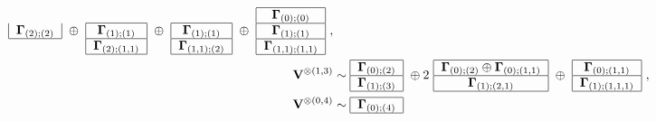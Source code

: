 \documentclass[12pt,reqno]{amsart}
\numberwithin{equation}{section}
\theoremstyle{plain}
\theoremstyle{definition}
\def\o{\otimes}
\def\glV_#1{\boldsymbol\Gamma_{#1}}
\def\VV{\mathbf V}
\begin{document}
\begin{align*}
\begin{tabular}{|c|}
        $\glV_{(2);(2)}$\\
        \hline
    \end{tabular}
    \ \oplus \
    \begin{tabular}{|c|}
        \multicolumn{1}{c}{ }\\
        \hline
        $\glV_{(1);(1)}$\\
        \hline
        $\glV_{(2);(1,1)}$\\
        \hline
    \end{tabular}
    \ \oplus \
    \begin{tabular}{|c|}
        \multicolumn{1}{c}{ }\\
        \hline
        $\glV_{(1);(1)}$\\
        \hline
        $\glV_{(1,1);(2)}$\\
        \hline
    \end{tabular}
    \ \oplus \
    \begin{tabular}{|c|}
        \hline
        $\glV_{(0);(0)}$\\
        \hline
        $\glV_{(1);(1)}$\\
        \hline
        $\glV_{(1,1);(1,1)}$\\
        \hline
    \end{tabular}\ ,
\\
    \VV^{\o(1,3)} & \sim
    \begin{tabular}{|c|}
        \hline
        $\glV_{(0);(2)}$\\
        \hline
        $\glV_{(1);(3)}$\\
        \hline
    \end{tabular}
    \ \oplus 2 \
    \begin{tabular}{|c|}
        \hline
        $\glV_{(0);(2)} \oplus \glV_{(0);(1,1)}$\\
        \hline
        $\glV_{(1);(2,1)}$\\
        \hline
    \end{tabular}
    \ \oplus \
    \begin{tabular}{|c|}
        \hline
        $\glV_{(0);(1,1)}$\\
        \hline
        $\glV_{(1);(1,1,1)}$\\
        \hline
    \end{tabular}\ ,
\\
    \VV^{\o(0,4)} &\sim
    \begin{tabular}{|c|}
        \hline
        $\glV_{(0);(4)}$\\
        \hline
    \end{tabular}

\end{align*}
\end{document}
